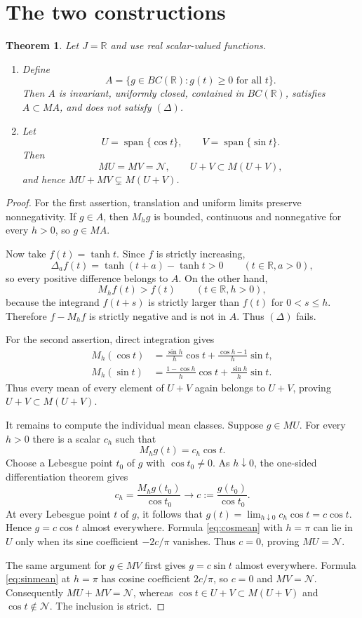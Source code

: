 \documentclass[11pt]{article}
\newtheorem{theorem}{Theorem}
\newcommand{\R}{\mathbb R}
\newcommand{\Nul}{\mathcal N}
\begin{document}
\section{The two constructions}

\begin{theorem}\label{thm:main}
Let $J=\R$ and use real scalar-valued functions.
\begin{enumerate}
\item Define
\[
 A=\{g\in BC(\R):g(t)\geq0\text{ for all }t\}.
\]
Then $A$ is invariant, uniformly closed, contained in $BC(\R)$, satisfies
$A\subset MA$, and does not satisfy $(\Delta)$.
\item Let
\[
 U=\operatorname{span}\{\cos t\},\qquad
 V=\operatorname{span}\{\sin t\}.
\]
Then
\[
 MU=MV=\Nul,
 \qquad
 U+V\subset M(U+V),
\]
and hence $MU+MV\subsetneq M(U+V)$.
\end{enumerate}
\end{theorem}

\begin{proof}
For the first assertion, translation and uniform limits preserve
nonnegativity.  If $g\in A$, then $M_hg$ is bounded, continuous and
nonnegative for every $h>0$, so $g\in MA$.

Now take $f(t)=\tanh t$.  Since $f$ is strictly increasing,
\[
 \Delta_af(t)=\tanh(t+a)-\tanh t>0
 \qquad(t\in\R, a>0),
\]
so every positive difference belongs to $A$.  On the other hand,
\[
 M_hf(t)>f(t)\qquad(t\in\R, h>0),
\]
because the integrand $f(t+s)$ is strictly larger than $f(t)$ for
$0<s\leq h$.  Therefore $f-M_hf$ is strictly negative and is not in $A$.
Thus $(\Delta)$ fails.

For the second assertion, direct integration gives
\begin{align}
 M_h(\cos t)
 &=\frac{\sin h}{h}\cos t+\frac{\cos h-1}{h}\sin t,\label{eq:cosmean}\\
 M_h(\sin t)
 &=\frac{1-\cos h}{h}\cos t+\frac{\sin h}{h}\sin t.\label{eq:sinmean}
\end{align}
Thus every mean of every element of $U+V$ again belongs to $U+V$, proving
$U+V\subset M(U+V)$.

It remains to compute the individual mean classes.  Suppose $g\in MU$.
For every $h>0$ there is a scalar $c_h$ such that
\[
 M_hg(t)=c_h\cos t.
\]
Choose a Lebesgue point $t_0$ of $g$ with $\cos t_0\ne0$.  As $h\downarrow0$,
the one-sided differentiation theorem gives
\[
 c_h=\frac{M_hg(t_0)}{\cos t_0}\longrightarrow
 c:=\frac{g(t_0)}{\cos t_0}.
\]
At every Lebesgue point $t$ of $g$, it follows that
$g(t)=\lim_{h\downarrow0}c_h\cos t=c\cos t$.  Hence $g=c\cos t$ almost
everywhere.  Formula \eqref{eq:cosmean} with $h=\pi$ can lie in $U$ only
when its sine coefficient $-2c/\pi$ vanishes.  Thus $c=0$, proving
$MU=\Nul$.

The same argument for $g\in MV$ first gives $g=c\sin t$ almost everywhere.
Formula \eqref{eq:sinmean} at $h=\pi$ has cosine coefficient $2c/\pi$, so
$c=0$ and $MV=\Nul$.  Consequently $MU+MV=\Nul$, whereas
$\cos t\in U+V\subset M(U+V)$ and $\cos t\notin\Nul$.  The inclusion is
strict.
\end{proof}
\end{document}
